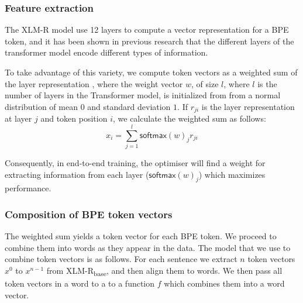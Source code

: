 \documentclass[11pt]{article}
\newcommand\adam[1]{(\textbf{Adam:} #1)}
\newcommand\citep{\cite}
\newcommand\softmax{\mathsf{softmax}}
\begin{document}
	\subsubsection{Feature extraction}
        \label{sec:bpe-features}

                    The XLM-R model use 12 layers to compute a
     vector representation for a BPE token, and it has been shown in previous
     research
     \citep{kondratyukstraka,raganato2018analysis,liu2019linguistic}
     that the different layers of the transformer model encode
     different types of information.


                    To take advantage of this variety, we compute token
     vectors as a weighted sum of the layer representation
     \citep{kondratyukstraka}, where the weight vector $w$, of size
     $l$, where $l$ is the number of layers in the Transformer model,
     is initialized from from a normal distribution of mean $0$ and
     standard deviation $1$. If $r_{ji}$ is the layer representation
     at layer $j$ and token position $i$, we calculate the weighted
     sum as follows:
    \begin{equation}
		x_i = \sum_{j=1}^{l} \softmax(w)_j r_{ji}
	\end{equation}

        Consequently, in end-to-end training, the optimiser will find
        a weight for extracting information from each layer
        ($\softmax(w)_j$) which maximizes performance.

     \subsubsection{Composition of BPE token vectors}
          The weighted sum yields a token vector for each BPE token. We
     proceed to combine them into words as they appear in the data.
      The model that we use to combine token vectors is as
     follows. For each sentence we extract $n$ token vectors $x^0$ to
     $x^{n-1}$ from XLM-R\textsubscript{base}, and then align them to words.
        We then pass all token vectors in a word to a to a function $f$ which combines
     them into a word vector.
    
\end{document}
